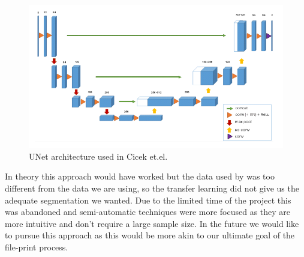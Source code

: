 \begin{figure}[H]
  \centering
  \includegraphics[width=\linewidth]{img/volumetricUNetArchitecture.PNG}
  \caption{UNet architecture used in Cicek et.el. \cite{cciccek20163d}}
  \label{fig:uNet}
\end{figure}

In theory this approach would have worked but the data used by \cite{cciccek20163d} was too different from the data we are using, so the transfer learning did not give us the adequate segmentation we wanted.  Due to the limited time of the project this was abandoned and semi-automatic techniques were more focused as they are more intuitive and don't require a large sample size.  In the future we would like to pursue this approach as this would be more akin to our ultimate goal of the file-print process.
